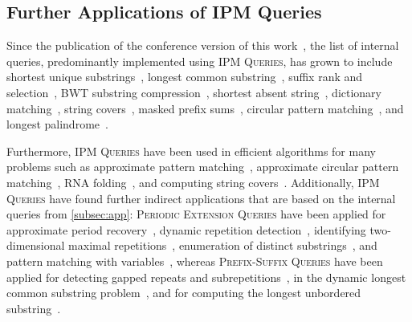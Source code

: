 \documentclass[a4paper]{article}
\theoremstyle{definition}
\theoremstyle{remark}
\newcommand{\IPM}{\textsc{IPM Queries}\xspace}
\newcommand{\BQ}{\textsc{Prefix-Suffix Queries}\xspace}
\newcommand{\PEQ}{\textsc{Periodic Extension Queries}\xspace}
\begin{document}
\subsection{Further Applications of IPM Queries}\label{sec:alien}
Since the publication of the conference version of this work~\cite{DBLP:conf/soda/KociumakaRRW15}, 
the list of internal queries, predominantly implemented using \IPM, has grown to include
shortest unique substrings~\cite{DBLP:journals/algorithms/Abedin0PT20},
longest common substring~\cite{DBLP:journals/corr/abs-1804-08731},
suffix rank and selection~\cite{WaveletSuffixTree,DBLP:conf/cpm/Kociumaka16},
BWT substring compression~\cite{WaveletSuffixTree},
shortest absent string~\cite{DBLP:journals/tcs/BadkobehCKP22},
dictionary matching~\cite{DBLP:journals/algorithmica/Charalampopoulos21},
string covers~\cite{DBLP:conf/spire/CrochemoreIRRSW20},
masked prefix sums~\cite{DBLP:conf/spire/Das0KMW22},
circular pattern matching~\cite{CPM2023}, and
longest palindrome~\cite{DBLP:conf/walcom/MitaniMSH23}.

Furthermore, \IPM have been used in efficient algorithms for many problems such
as approximate pattern matching~\cite{DBLP:conf/focs/Charalampopoulos20,DBLP:conf/focs/Charalampopoulos22},
approximate circular pattern matching~\cite{DBLP:journals/jcss/Charalampopoulos21,DBLP:conf/esa/Charalampopoulos22},
RNA folding~\cite{DBLP:conf/icalp/0001KS22},
and computing string covers~\cite{DBLP:conf/esa/RadoszewskiS20}.
Additionally, \IPM have found further indirect applications that are based on the internal queries from \cref{subsec:app}:
\PEQ have been applied for
approximate period recovery~\cite{DBLP:journals/tcs/AmirALS18,DBLP:journals/algorithmica/AmirBKLS22},
dynamic repetition detection~\cite{DBLP:conf/esa/AmirBCK19},
identifying two-dimensional maximal repetitions~\cite{DBLP:conf/esa/AmirLMS18},
enumeration of distinct substrings~\cite{DBLP:conf/spire/Charalampopoulos20},
and pattern matching with variables~\cite{DBLP:journals/toct/FernauMMS20,DBLP:conf/spire/KosolobovMN17},
whereas
\BQ have been applied for detecting gapped repeats and subrepetitions~\cite{DBLP:journals/jda/KolpakovPPK17,DBLP:journals/mst/GawrychowskiIIK18},
in the dynamic longest common substring problem~\cite{DBLP:journals/corr/abs-1804-08731},
and for computing the longest unbordered substring~\cite{DBLP:journals/corr/abs-1805-09924}.
\end{document}
